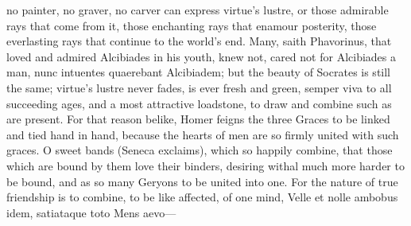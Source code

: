 {no painter, no graver, no carver can express virtue's lustre, or those
admirable rays that come from it, those enchanting rays that enamour
posterity, those everlasting rays that continue to the world's end.
Many, saith Phavorinus, that loved and admired Alcibiades in his youth,
knew not, cared not for Alcibiades a man, nunc intuentes quaerebant
Alcibiadem; but the beauty of Socrates is still the same;
virtue's lustre never fades, is ever fresh and green, semper viva
to all succeeding ages, and a most attractive loadstone, to draw and
combine such as are present. For that reason belike, Homer feigns the
three Graces to be linked and tied hand in hand, because the hearts of
men are so firmly united with such graces. O sweet bands (Seneca
exclaims), which so happily combine, that those which are bound by them
love their binders, desiring withal much more harder to be bound, and
as so many Geryons to be united into one. For the nature of true
friendship is to combine, to be like affected, of one mind,
Velle et nolle ambobus idem, satiataque toto
Mens aevo---

}
